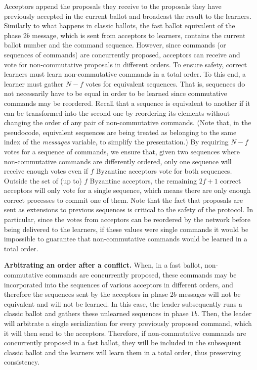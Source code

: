 	\vspace*{-.4cm}
Acceptors append the proposals they receive to the proposals they have previously accepted in the current ballot and broadcast the result to the learners. Similarly to what happens in classic ballots, the fast ballot equivalent of the phase $2b$ message, which is sent from acceptors to learners, contains the current ballot number and the command sequence. However, since commands (or sequences of commands) are concurrently proposed, acceptors can receive and vote for non-commutative proposals in different orders. To ensure safety, correct learners must learn non-commutative commands in a total order. To this end, a learner must gather $N-f$ votes for equivalent sequences. That is, sequences do not necessarily have to be equal in order to be learned since commutative commands may be reordered. Recall that a sequence is equivalent to another if it can be transformed into the second one by reordering its elements without changing the order of any pair of non-commutative commands. (Note that, in the pseudocode, equivalent sequences are being treated as belonging to the same index of the \emph{messages} variable, to simplify the presentation.) By requiring $N-f$ votes for a sequence of commands, we ensure that, given two sequences where non-commutative commands are differently ordered, only one sequence will receive enough votes even if $f$ Byzantine acceptors vote for both sequences. Outside the set of (up to) $f$ Byzantine acceptors, the remaining $2f+1$ correct acceptors will only vote for a single sequence, which means there are only enough correct processes to commit one of them. Note that the fact that proposals are sent as extensions to previous sequences is critical to the safety of the protocol. In particular, since the votes from acceptors can be reordered by the network before being delivered to the learners, if these values were single commands it would be impossible to guarantee that non-commutative commands would be learned in a total order. \par
\noindent \textbf{Arbitrating an order after a conflict.} When, in a fast ballot, non-commutative commands are  concurrently proposed, these commands may be incorporated into the sequences of various acceptors in different orders, and therefore the sequences sent by the acceptors in phase $2b$ messages will not be equivalent and will not be learned. In this case, the leader subsequently runs a classic ballot and gathers these unlearned sequences in phase $1b$. Then, the leader will arbitrate a single serialization for every previously proposed command, which it will then send to the acceptors. Therefore, if non-commutative commands are concurrently proposed in a fast ballot, they will be included in the subsequent classic ballot and the learners will learn them in a total order, thus preserving consistency.\par
